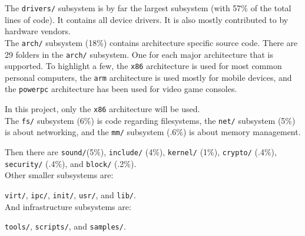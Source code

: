 \documentclass[a4paper,11pt]{report}
\newcommand{\figa}{
    \begin{figure}[!htpb]
    \centering
}
\newcommand{\figb}[2]{
    \caption{#1}
    \label{#2}
    \end{figure}
}
\begin{document}
The \texttt{drivers/} subsystem is by far the largest subsystem (with 57\% of 
the total lines of code). It contains all device drivers. It is also mostly 
contributed to by hardware vendors.
\\

The \texttt{arch/} subsystem (18\%) contains architecture specific source code. 
There are 29 folders in the \texttt{arch/} subsystem. One for each major 
architecture that is supported. To highlight a few, the \texttt{x86} 
architecture is used for most common personal computers, the \texttt{arm} 
architecture is used mostly for mobile devices, and the \texttt{powerpc} 
architecture has been used for video game consoles.

In this project, only the \texttt{x86} architecture will be used.
\\

The \texttt{fs/} subsystem (6\%) is code regarding filesystems, the 
\texttt{net/} subsystem (5\%) is about networking, and the \texttt{mm/} 
subsystem (.6\%) is about memory management.

Then there are \texttt{sound/}(5\%), \texttt{include/} (4\%), \texttt{kernel/} 
(1\%), \texttt{crypto/} (.4\%), \texttt{security/}  (.4\%), and \texttt{block/} 
(.2\%).
\\

Other smaller subsystems are:

\texttt{virt/}, \texttt{ipc/}, \texttt{init/}, \texttt{usr/}, and \texttt{lib/}.
\\

And infrastructure subsystems are:

\texttt{tools/}, \texttt{scripts/}, and \texttt{samples/}.

\end{document}
